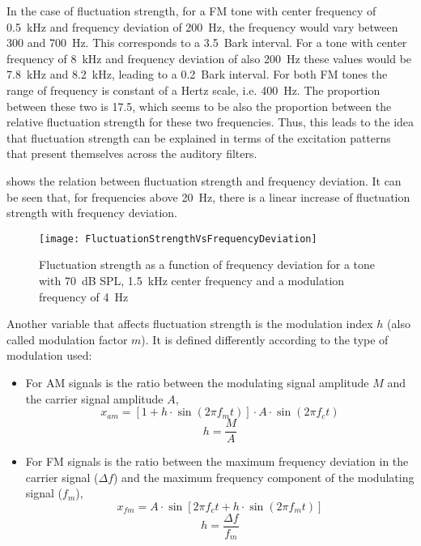 \documentclass[../main.tex]{subfiles}
\begin{document}
\begin{theoreticalbackground}
In the case of fluctuation strength, for a \gls{FM} tone with center frequency
of 0.5~kHz and frequency deviation of 200~Hz, the frequency would vary between
300 and 700~Hz. This corresponds to a 3.5~Bark interval. For a tone with center
frequency of 8~kHz and frequency deviation of also 200~Hz these values would be
7.8~kHz and 8.2~kHz, leading to a 0.2~Bark interval. For both \gls{FM} tones the
range of frequency is constant of a Hertz scale, i.e. 400~Hz. The proportion
between these two is 17.5, which seems to be also the proportion between the
relative fluctuation strength for these two frequencies. Thus, this leads to the
idea that fluctuation strength can be explained in terms of the excitation
patterns that present themselves across the auditory filters.

 shows the relation between fluctuation strength
and frequency deviation. It can be seen that, for frequencies above 20~Hz, there
is a linear increase of fluctuation strength with frequency deviation.

\begin{figure}[!ht]
  \centering
  \texttt{[image: FluctuationStrengthVsFrequencyDeviation]}
    \caption{Fluctuation strength as a function of frequency deviation for a
      tone with 70~dB SPL, 1.5~kHz center frequency and a modulation frequency
      of 4~Hz~\cite[pp. 251]{Fastl2007Psychoacoustics}}
\label{fig:flucstrenvsfreqdev}
\end{figure}

Another variable that affects fluctuation strength is the modulation index $h$
(also called modulation factor $m$). It is defined differently according to the
type of modulation used:
\begin{itemize}
  \item For \gls{AM} signals is the ratio between the modulating signal
    amplitude $M$ and the carrier signal amplitude $A$,
      \begin{equation}
        x_{am} = [1+h \cdot \sin(2\pi f_m t)]\cdot A \cdot \sin(2\pi f_c t)
      \end{equation}
      \begin{equation}
        h=\frac{M}{A}
      \end{equation}
  \item For \gls{FM} signals is the ratio between the maximum frequency
    deviation in the carrier signal ($\Delta f$) and the maximum frequency
    component of the modulating signal ($f_m$),
      \begin{equation}
        x_{fm} = A \cdot \sin[2\pi f_c t + h \cdot \sin(2 \pi f_m t)]
      \end{equation}
      \begin{equation}
        h=\frac{\Delta f}{f_m}
      \end{equation}
\end{itemize}


\end{theoreticalbackground}
\end{document}
